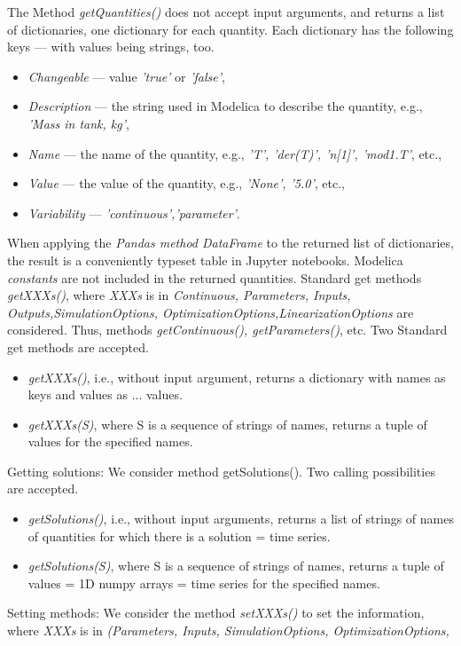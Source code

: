 \begin{enumerate}
	The Method \textit{getQuantities()} does not accept input arguments, and returns a list of dictionaries, one dictionary for each
	quantity. Each dictionary has the following keys — with values being strings, too.
	\begin{itemize}
		\item \textit{Changeable} — value \textit{'true'} or \textit{'false'},
		\item \textit{Description} — the string used in Modelica to describe the quantity, e.g., \textit{'Mass in tank, kg'},
		\item \textit{Name} — the name of the quantity, e.g., \textit{'T', 'der(T)', 'n[1]', 'mod1.T'}, etc.,
		\item \textit{Value} — the value of the quantity, e.g., \textit{'None', '5.0'}, etc.,
		\item \textit{Variability} — \textit{'continuous','parameter'}.
    \end{itemize}
	When applying the \textit{Pandas method DataFrame} to the returned list of dictionaries, the result is a conveniently
	typeset table in Jupyter notebooks. Modelica \textit{constants} are not included in the returned quantities. Standard get 
	methods \textit{getXXXs()}, where \textit{XXXs} is in	\textit{{Continuous, Parameters, Inputs, Outputs,SimulationOptions, OptimizationOptions,LinearizationOptions}} are considered. Thus, methods \textit{getContinuous(), getParameters()}, etc.
	Two Standard get methods are accepted.
	\begin{itemize}
		\item \textit{getXXXs()}, i.e., without input argument, returns a dictionary with names as keys and values as ... values.
		\item \textit{getXXXs(S)}, where S is a sequence of strings of names, returns a tuple of values for the specified names.
    \end{itemize}
	Getting solutions: We consider method getSolutions(). Two calling possibilities are accepted.
	\begin{itemize}
		\item \textit{getSolutions()}, i.e., without input arguments, returns a list of strings of names of quantities for
			          which there is a solution = time series.
		\item \textit{getSolutions(S)}, where S is a sequence of strings of names, returns a tuple of values = 1D
					numpy arrays = time series for the specified names.
	\end{itemize}
	Setting methods: We consider the method \textit{setXXXs()} to set the information, where \textit{XXXs} is in \textit{(Parameters, Inputs, SimulationOptions, OptimizationOptions,
}
\end{enumerate}
